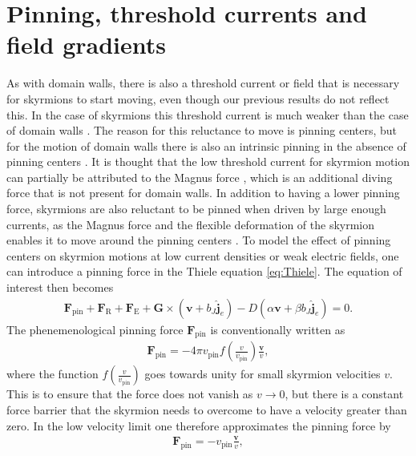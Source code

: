 \section{Pinning, threshold currents and field gradients}
As with domain walls, there is also a threshold current or field that is necessary for skyrmions to start moving, even though our previous results do not reflect this. In the case of skyrmions this threshold current is much weaker than the case of domain walls \cite{Jonietz2010}. The reason for this reluctance to move is pinning centers, but for the motion of domain walls there is also an intrinsic pinning in the absence of pinning centers \cite{Koyama2011}. It is thought that the low threshold current for skyrmion motion can partially be attributed to the Magnus force \cite{Iwasaki2013}, which is an additional diving force that is not present for domain walls. In addition to having a lower pinning force, skyrmions are also reluctant to be pinned when driven by large enough currents, as the Magnus force and the flexible deformation of the skyrmion enables it to move around the pinning centers \cite{Iwasaki2013}. To model the effect of pinning centers on skyrmion motions at low current densities or weak electric fields, one can introduce a pinning force in the Thiele equation \eqref{eq:Thiele}. The equation of interest then becomes
\begin{align}
\label{eq:PinningThiele}
\mathbold{F}_{\textrm{pin}}+\mathbold{F}_{\text{R}}+\mathbold{F}_{\text{E}} + \mathbold{G} \times\left(\mathbold{v}+b_J\mathbold{\hat{j}}_e\right) - D\left(\alpha\mathbold{v}+\beta b_J \mathbold{\hat{j}}_e\right) = 0.
\end{align}
The phenemenological pinning force $\mathbold{F}_{\textrm{pin}}$ is conventionally written as \cite{Everschor2012, IwasakiNagaosa2013}
\begin{align}
\mathbold{F}_{\textrm{pin}} = -4\pi v_{\textrm{pin}} f(\frac{v}{v_{\textrm{pin}}}) \frac{\mathbold{v}}{v},
\end{align}
where the function $f(\frac{v}{v_{\textrm{pin}}})$ goes towards unity for small skyrmion velocities $v$. This is to ensure that the force does not vanish as $v\rightarrow 0$, but there is a constant force barrier that the skyrmion needs to overcome to have a velocity greater than zero. In the low velocity limit one therefore approximates the pinning force by
\begin{align}
\mathbold{F}_{\textrm{pin}} = - v_{\textrm{pin}} \frac{\mathbold{v}}{v},
\end{align}
